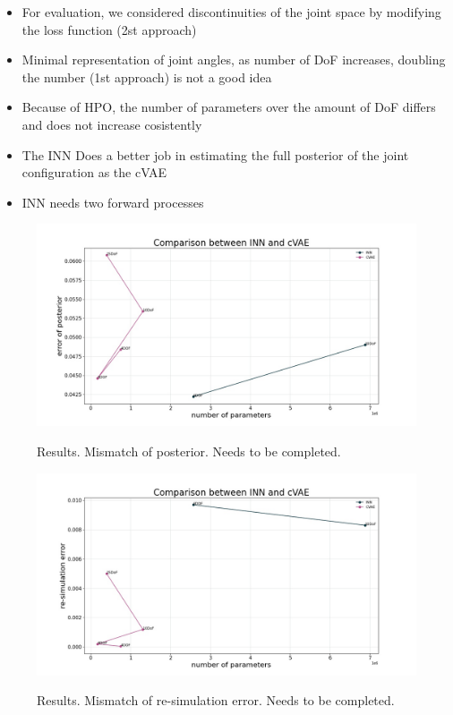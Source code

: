 \documentclass[conference]{IEEEtran}
\begin{document}
\begin{itemize}
	\item For evaluation, we considered discontinuities of the joint space by modifying the loss function (2st approach) 
	\item Minimal representation of joint angles, as number of DoF increases, doubling the number (1st approach) is not a good idea
	\item Because of HPO, the number of parameters over the amount of DoF differs and does not increase cosistently
	\item The INN Does a better job in estimating the full posterior of the joint configuration as the cVAE
	\item INN needs two forward processes
\end{itemize}

\begin{figure}[!ht]
\centering
	\includegraphics[width=\linewidth]{figures/comparison_e_posterior_alternative.jpg}
    \label{fig:plot:posterior}
    \caption{\label{fig:plot:posterior} Results. Mismatch of posterior. Needs to be completed.}
\end{figure}

\begin{figure}[!ht]
\centering
	\includegraphics[width=\linewidth]{figures/comparison_e_resim_alternative.jpg}
    \label{fig:plot:posterior}
    \caption{\label{fig:plot:resim} Results. Mismatch of re-simulation error. Needs to be completed.}
\end{figure}
\end{document}
